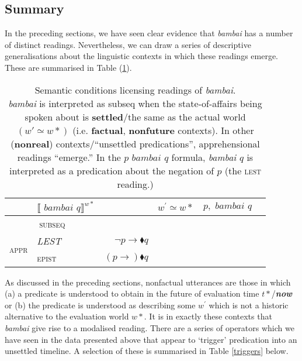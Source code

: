 \documentclass[11pt]{article}
\providecommand{\denote}[2][]{\ensuremath{\llbracket{#2}\rrbracket^{#1}}}
\newcommand{\xmark}{\ding{55}}
\begin{document}
\subsection{Summary}

In the preceding sections, we have seen clear evidence that \textit{bambai} has a number of distinct readings. Nevertheless, we can draw a series of descriptive generalisations about the linguistic contexts in which these readings emerge. These are summarised in Table (\ref{readingstable}).

\begin{table}[h]
	\caption{Semantic conditions licensing readings of \textit{bambai}.\\
				\textit{bambai} is interpreted as {\sc subseq} when the state-of-affairs being spoken about is \textbf{settled}/the same as the actual world $(w'\simeq w*)$  (i.e. \textbf{factual}, \textbf{nonfuture}  contexts). In other (\textbf{nonreal}) contexts/``unsettled predications'', apprehensional readings ``emerge.''  In the $p \textit{ bambai } q$ formula, \textit{bambai $q$} is interpreted as a predication about the negation of $p$ (the \textsc{lest} reading.)} \label{readingstable}\centering
	\begin{tabular}{llrccc}\toprule
		&  \denote[w*]{\textit{ bambai } q} && $w^\prime\simeq w*$ & $p,\textit{ bambai }q$      \\\midrule\midrule
		\multicolumn{2}{c}{\textsc{subseq}}  &       & \checkmark      & \xmark        \\\midrule
		\multirow{2}{*}{\textsc{appr}} & {\footnotesize\textit{LEST}} &$\neg p\to\blacklozenge q$ & \xmark           & \checkmark     \\
		& \textsc{epist} &$(p\to)\blacklozenge q$& \xmark            &\xmark\\\bottomrule
	\end{tabular}
	
\end{table}


As discussed in the preceding sections, nonfactual utterances are those in which  (a) a predicate is understood to obtain in the future of evaluation time $t*$/\textbf{\textit{now}} or (b) the predicate is understood as describing some $w^\prime$ which is not a historic alternative to the evaluation world $w*$. It is in exactly these contexts that \textit{bambai} give rise to a modalised reading. There are a series of operators which we have seen in the data presented above that appear to `trigger' predication into an unsettled timeline. A selection of these is summarised in Table \ref{triggers} below.
\end{document}
